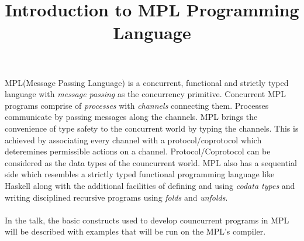 \documentclass[11pt]{article}
\title{Introduction to MPL Programming Language}
\begin{document}
\maketitle

MPL(Message Passing Language) is a concurrent, functional and strictly typed language with {\em message passing} as the concurrency primitive. Concurrent MPL programs comprise of {\em processes} with {\em channels} connecting them. Processes communicate by passing messages along the channels. MPL brings the convenience of type safety to the concurrent world by typing the channels. This is achieved by associating every channel with a protocol/coprotocol which deteremines permissible actions on a channel. Protocol/Coprotocol can be considered as the data types of the councurrent world. MPL also has a sequential side which resembles a strictly typed functional programming language like Haskell along with the additional facilities of defining and using {\em codata types} and writing disciplined recursive programs using {\em folds} and {\em unfolds}.
~~\\~~\\
In the talk, the basic constructs used to develop councurrent programs in MPL will be described with examples that will be run on the MPL's compiler.
\end{document}
